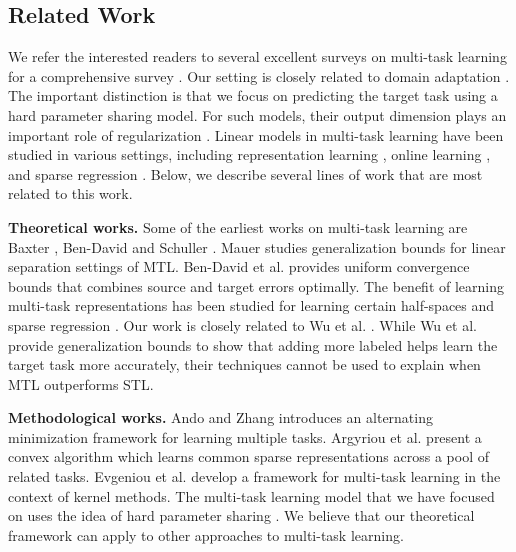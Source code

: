 \subsection{Related Work}

We refer the interested readers to several excellent surveys on multi-task  learning for a comprehensive survey \cite{PY09,R17,ZY17,V20}.
Our setting is closely related to domain adaptation \cite{DM06,BB07,BC08,DH09,MMR09,CWB11,ZS13,NB17,ZD19}.
The important distinction is that we focus on predicting the target task using a hard parameter sharing model.
For such models, their output dimension plays an important role of regularization \cite{KD12}.
Linear models in multi-task learning have been studied in various settings, including representation learning \cite{BHKL19}, online learning \cite{CCG10,DCSP18}, and sparse regression \cite{LPVT11}.
Below, we describe several lines of work that are most related to this work.

\medskip
\noindent\textbf{Theoretical works.}
Some of the earliest works on multi-task learning are Baxter \cite{B00}, Ben-David and Schuller \cite{BS03}.
Mauer \cite{M06} studies generalization bounds for linear separation settings of MTL.
Ben-David et al. \cite{BBCK10} provides uniform convergence bounds that combines source and target errors optimally.
The benefit of learning multi-task representations has been studied for learning certain half-spaces \cite{MPR16} and sparse regression \cite{LPTV09,LPVT11}.
Our work is closely related to Wu et al. \cite{WZR20}.
While Wu et al. provide generalization bounds to show that adding more labeled helps learn the target task more accurately, their techniques cannot be used to explain when MTL outperforms STL.

\medskip
\noindent\textbf{Methodological works.}
Ando and Zhang \cite{AZ05} introduces an alternating minimization framework for learning multiple tasks.
Argyriou et al. \cite{AEP08} present a convex algorithm which learns common sparse representations across a pool of related tasks.
Evgeniou et al. \cite{EMP05} develop a framework for multi-task learning in the context of kernel methods.
The multi-task learning model that we have focused on uses the idea of hard parameter sharing \cite{C93,KD12,R17}.
We believe that our theoretical framework can apply to other approaches to multi-task learning.

